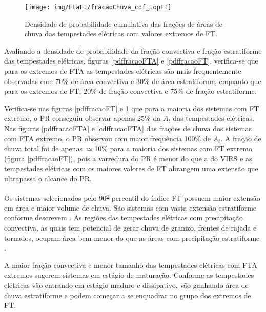 \begin{figure}[!ht]
  \centering 
  \texttt{[image: img/FtaFt/fracaoChuva\_cdf\_topFT]}
  \caption{Densidade de probabilidade cumulativa das frações de áreas de chuva das tempestades elétricas com valores extremos de FT.}
  \label{cdffracaoFT}
\end{figure}

Avaliando a densidade de probabilidade da fração convectiva e fração estratiforme das tempestades elétricas, figuras \ref{pdffracaoFTA} e \ref{pdffracaoFT}, verifica-se que para os extremos de FTA as tempestades elétricas são mais frequentemente observadas com 70\% de área convectiva e 30\% de área estratiforme, enquanto que para os extremos de FT, 20\% de fração convectiva e 75\% de fração estratiforme.

Verifica-se nas figuras \ref{pdffracaoFT} e \ref{cdffracaoFT} que para a maioria dos sistemas com FT extremo, o PR conseguiu observar apenas 25\% da $A_t$ das tempestades elétricas. Nas figuras \ref{pdffracaoFTA} e \ref{cdffracaoFTA} das frações de chuva dos sistemas com FTA extremo, o PR observou com maior frequência 100\% de $A_t$. A fração de chuva total foi de apenas  $\simeq$10\% para a maioria dos sistemas com FT extremo (figura \ref{pdffracaoFT}), pois a varredura do PR é menor do que a do VIRS e as tempestades elétricas com os maiores valores de FT abrangem uma extensão que ultrapassa o alcance do PR. 


Os sistemas selecionados pelo 90\textsuperscript{\underline{o}} percentil do índice FT possuem maior extensão em área e maior volume de chuva. São sistemas com vasta extensão estratiforme conforme descrevem . As regiões das tempestades elétricas com precipitação convectiva, as quais tem potencial de gerar chuva de granizo, frentes de rajada e tornados, ocupam área bem menor do que as áreas com  precipitação estratiforme \cite{Jr2007}.

A maior fração convectiva e menor tamanho das tempestades elétricas com FTA extremos sugerem sistemas em estágio de maturação. Conforme as tempestades elétricas vão entrando em estágio maduro e dissipativo, vão ganhando área de chuva estratiforme e podem começar a se enquadrar no grupo dos extremos de FT. 


